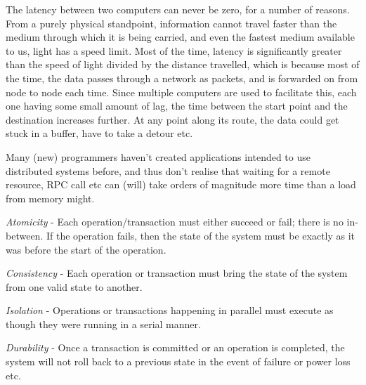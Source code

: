 
The latency between two computers can never be zero, for a number of reasons.
From a purely physical standpoint, information cannot travel faster than the
medium through which it is being carried, and even the fastest medium available
to us, light has a speed limit. Most of the time, latency is significantly
greater than the speed of light divided by the distance travelled, which is
because most of the time, the data passes through a network as packets, and is
forwarded on from node to node each time. Since multiple computers are used to
facilitate this, each one having some small amount of lag, the time between the
start point and the destination increases further. At any point along its route,
the data could get stuck in a buffer, have to take a detour etc.

Many (new) programmers haven't created applications intended to use distributed
systems before, and thus don't realise that waiting for a remote resource, RPC
call etc can (will) take orders of magnitude more time than a load from memory
might.


\begin{description}
  \item \textit{Atomicity} - Each operation/transaction must either succeed or 
  fail; there is no in-between. If the operation fails, then the state of the
  system must be exactly as it was before the start of the operation.
  \item \textit{Consistency} - Each operation or transaction must bring the
  state of the system from one valid state to another.
  \item \textit{Isolation} - Operations or transactions happening in parallel
  must execute as though they were running in a serial manner.
  \item \textit{Durability} - Once a transaction is committed or an operation
  is completed, the system will not roll back to a previous state in the event
  of failure or power loss etc.
\end{description}


